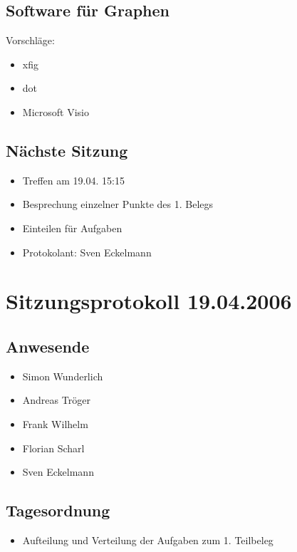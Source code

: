 			\subsection{Software für Graphen}
			Vorschläge:
			\begin{itemize}
				\item xfig
				\item dot
				\item Microsoft Visio
			\end{itemize}
			\subsection{Nächste Sitzung}
			\begin{itemize}
				\item Treffen am 19.04. 15:15
				\item Besprechung einzelner Punkte des 1. Belegs
				\item Einteilen für Aufgaben
			\end{itemize}
		\begin{itemize}
			\item Protokolant: Sven Eckelmann
		\end{itemize}
\newpage
		\section{Sitzungsprotokoll 19.04.2006}
		\subsection{Anwesende}
		\begin{itemize}
			\item Simon Wunderlich
			\item Andreas Tröger
			\item Frank Wilhelm
			\item Florian Scharl
			\item Sven Eckelmann
		\end{itemize}
		\subsection{Tagesordnung}
		\begin{itemize}
			\item Aufteilung und Verteilung der Aufgaben zum 1. Teilbeleg
		\end{itemize}
